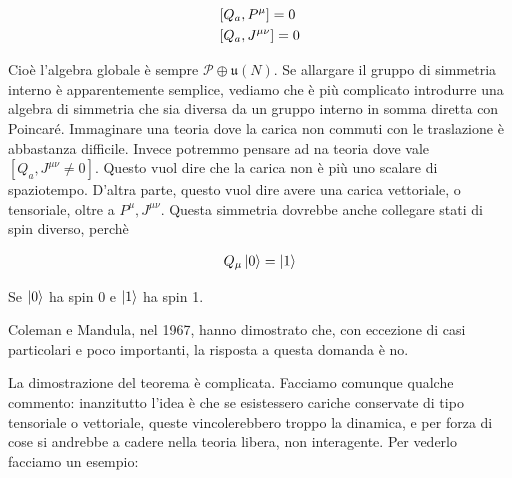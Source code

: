 \documentclass{report}
\begin{document}
\begin{align}
    &[Q_a, P^\mu] = 0 \notag \\ 
    &[Q_a, J^{\mu\nu}] = 0 
\end{align}

Cioè l'algebra globale è sempre \(\mathcal{P}\oplus \mathfrak{u}(N)\). Se allargare il gruppo di simmetria interno è apparentemente semplice, vediamo che è più complicato introdurre una algebra di simmetria che sia diversa da un gruppo interno in somma diretta con Poincaré. Immaginare una teoria dove la carica non commuti con le traslazione è abbastanza difficile. Invece potremmo pensare ad na teoria dove vale \([Q_a, J^{\mu\nu} \neq 0]\). Questo vuol dire che la carica non è più uno scalare di spaziotempo. D'altra parte, questo vuol dire avere una carica vettoriale, o tensoriale, oltre a \(P^\mu, J^{\mu\nu}\). Questa simmetria dovrebbe anche collegare stati di spin diverso, perchè 

\begin{align}
    Q_\mu \ket{0} = \ket{1}
\end{align}

Se \(\ket{0}\) ha spin 0 e \(\ket{1}\) ha spin 1. 

Coleman e Mandula, nel 1967, hanno dimostrato che, con eccezione di casi particolari e poco importanti, la risposta a questa domanda è no. 

La dimostrazione del teorema è complicata. Facciamo comunque qualche commento: inanzitutto l'idea è che se esistessero cariche conservate di tipo tensoriale o vettoriale, queste vincolerebbero troppo la dinamica, e per forza di cose si andrebbe a cadere nella teoria libera, non interagente. Per vederlo facciamo un esempio: 
\end{document}
